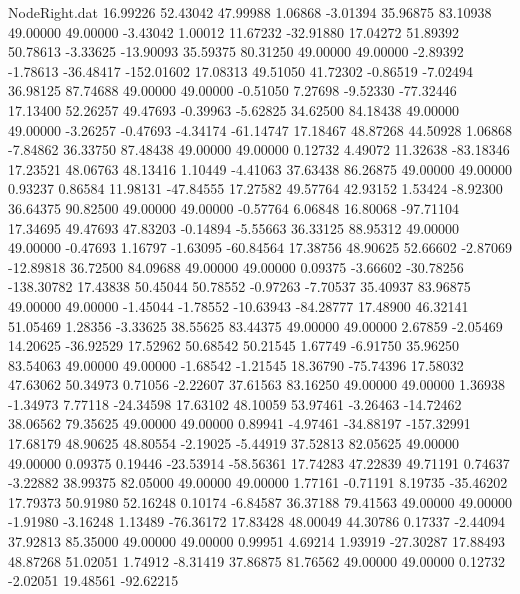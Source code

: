 \begin{filecontents}{NodeRight.dat}
  16.99226   52.43042   47.99988     1.06868   -3.01394   35.96875   83.10938   49.00000   49.00000   -3.43042    1.00012   11.67232  -32.91880
  17.04272   51.89392   50.78613    -3.33625  -13.90093   35.59375   80.31250   49.00000   49.00000   -2.89392   -1.78613  -36.48417 -152.01602
  17.08313   49.51050   41.72302    -0.86519   -7.02494   36.98125   87.74688   49.00000   49.00000   -0.51050    7.27698   -9.52330  -77.32446
  17.13400   52.26257   49.47693    -0.39963   -5.62825   34.62500   84.18438   49.00000   49.00000   -3.26257   -0.47693   -4.34174  -61.14747
  17.18467   48.87268   44.50928     1.06868   -7.84862   36.33750   87.48438   49.00000   49.00000    0.12732    4.49072   11.32638  -83.18346
  17.23521   48.06763   48.13416     1.10449   -4.41063   37.63438   86.26875   49.00000   49.00000    0.93237    0.86584   11.98131  -47.84555
  17.27582   49.57764   42.93152     1.53424   -8.92300   36.64375   90.82500   49.00000   49.00000   -0.57764    6.06848   16.80068  -97.71104
  17.34695   49.47693   47.83203    -0.14894   -5.55663   36.33125   88.95312   49.00000   49.00000   -0.47693    1.16797   -1.63095  -60.84564
  17.38756   48.90625   52.66602    -2.87069  -12.89818   36.72500   84.09688   49.00000   49.00000    0.09375   -3.66602  -30.78256 -138.30782
  17.43838   50.45044   50.78552    -0.97263   -7.70537   35.40937   83.96875   49.00000   49.00000   -1.45044   -1.78552  -10.63943  -84.28777
  17.48900   46.32141   51.05469     1.28356   -3.33625   38.55625   83.44375   49.00000   49.00000    2.67859   -2.05469   14.20625  -36.92529
  17.52962   50.68542   50.21545     1.67749   -6.91750   35.96250   83.54063   49.00000   49.00000   -1.68542   -1.21545   18.36790  -75.74396
  17.58032   47.63062   50.34973     0.71056   -2.22607   37.61563   83.16250   49.00000   49.00000    1.36938   -1.34973    7.77118  -24.34598
  17.63102   48.10059   53.97461    -3.26463  -14.72462   38.06562   79.35625   49.00000   49.00000    0.89941   -4.97461  -34.88197 -157.32991
  17.68179   48.90625   48.80554    -2.19025   -5.44919   37.52813   82.05625   49.00000   49.00000    0.09375    0.19446  -23.53914  -58.56361
  17.74283   47.22839   49.71191     0.74637   -3.22882   38.99375   82.05000   49.00000   49.00000    1.77161   -0.71191    8.19735  -35.46202
  17.79373   50.91980   52.16248     0.10174   -6.84587   36.37188   79.41563   49.00000   49.00000   -1.91980   -3.16248    1.13489  -76.36172
  17.83428   48.00049   44.30786     0.17337   -2.44094   37.92813   85.35000   49.00000   49.00000    0.99951    4.69214    1.93919  -27.30287
  17.88493   48.87268   51.02051     1.74912   -8.31419   37.86875   81.76562   49.00000   49.00000    0.12732   -2.02051   19.48561  -92.62215

\end{filecontents}
